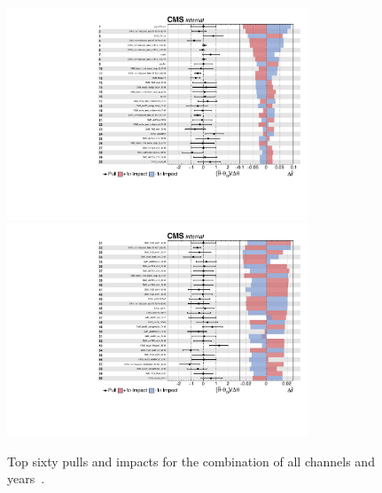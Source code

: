 \begin{figure}[ht]
    \begin{center}
        \includegraphics[width=0.8\textwidth]{figures/ch-8-systematic-uncertainties/impacts-all-1.pdf}\\
        \includegraphics[width=0.8\textwidth]{figures/ch-8-systematic-uncertainties/impacts-all-2.pdf}
    \end{center}
    \caption[Top sixty pulls and impacts for the combination of all channels and years.]{Top sixty pulls and impacts for the combination of all channels and years~\cite{CMS-AN-20-213}.}
    \label{fig:impacts_pages_1_2}
\end{figure}
